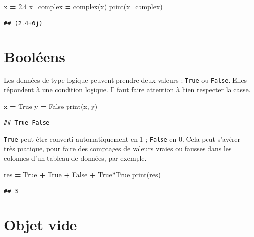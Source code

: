 \documentclass[
  12pt,
]{book}
\newenvironment{Shaded}{\begin{snugshade}}{\end{snugshade}}
\newcommand{\BuiltInTok}[1]{#1}
\newcommand{\FloatTok}[1]{\textcolor[rgb]{0.00,0.00,0.81}{#1}}
\newcommand{\NormalTok}[1]{#1}
\newcommand{\OperatorTok}[1]{\textcolor[rgb]{0.81,0.36,0.00}{\textbf{#1}}}
\newcommand{\VariableTok}[1]{\textcolor[rgb]{0.00,0.00,0.00}{#1}}
\numberwithin{equation}{section}
\numberwithin{countremarque}{section}
\begin{document}
\begin{Shaded}
\begin{Highlighting}[]
\NormalTok{x }\OperatorTok{=} \FloatTok{2.4}
\NormalTok{x\_complex }\OperatorTok{=} \BuiltInTok{complex}\NormalTok{(x)}
\BuiltInTok{print}\NormalTok{(x\_complex)}
\end{Highlighting}
\end{Shaded}

\begin{lstlisting}
## (2.4+0j)
\end{lstlisting}

\section{Booléens}\label{booluxe9ens}

Les données de type logique peuvent prendre deux valeurs : \texttt{True} ou \texttt{False}. Elles répondent
à une condition logique. Il faut faire attention à bien respecter la casse.

\begin{Shaded}
\begin{Highlighting}[]
\NormalTok{x }\OperatorTok{=} \VariableTok{True}
\NormalTok{y }\OperatorTok{=} \VariableTok{False}
\BuiltInTok{print}\NormalTok{(x, y)}
\end{Highlighting}
\end{Shaded}

\begin{lstlisting}
## True False
\end{lstlisting}

\texttt{True} peut être converti automatiquement en 1 ; \texttt{False} en 0. Cela peut s'avérer très pratique, pour faire des comptages de valeurs vraies ou fausses dans les colonnes d'un tableau de données, par exemple.

\begin{Shaded}
\begin{Highlighting}[]
\NormalTok{res }\OperatorTok{=} \VariableTok{True} \OperatorTok{+} \VariableTok{True} \OperatorTok{+} \VariableTok{False} \OperatorTok{+} \VariableTok{True}\OperatorTok{*}\VariableTok{True}
\BuiltInTok{print}\NormalTok{(res)}
\end{Highlighting}
\end{Shaded}

\begin{lstlisting}
## 3
\end{lstlisting}

\section{Objet vide}\label{objet-vide}
\end{document}
